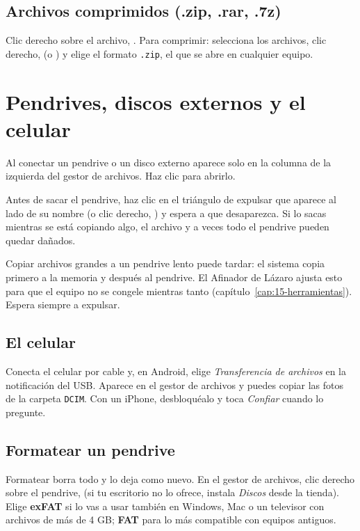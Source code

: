 \subsection{Archivos comprimidos (.zip, .rar, .7z)}
Clic derecho sobre el archivo, . Para comprimir:
selecciona los archivos, clic derecho,  (o
) y elige el formato \texttt{.zip}, el que se abre en
cualquier equipo.

\section{Pendrives, discos externos y el celular}

Al conectar un pendrive o un disco externo aparece solo en la columna de
la izquierda del gestor de archivos. Haz clic para abrirlo.

\begin{cuidado}
Antes de sacar el pendrive, haz clic en el triángulo de expulsar que
aparece al lado de su nombre (o clic derecho, ) y espera a
que desaparezca. Si lo sacas mientras se está copiando algo, el archivo
y a veces todo el pendrive pueden quedar dañados.
\end{cuidado}

\begin{nota}
Copiar archivos grandes a un pendrive lento puede tardar: el sistema
copia primero a la memoria y después al pendrive. El Afinador de Lázaro
ajusta esto para que el equipo no se congele mientras tanto
(capítulo~\ref{cap:15-herramientas}). Espera siempre a expulsar.
\end{nota}

\subsection{El celular}
Conecta el celular por cable y, en Android, elige \emph{Transferencia de
archivos} en la notificación del USB. Aparece en el gestor de archivos y
puedes copiar las fotos de la carpeta \texttt{DCIM}. Con un iPhone,
desbloquéalo y toca \emph{Confiar} cuando lo pregunte.

\subsection{Formatear un pendrive}
Formatear borra todo y lo deja como nuevo. En el gestor de archivos, clic
derecho sobre el pendrive,  (si tu escritorio no lo
ofrece, instala \emph{Discos} desde la tienda). Elige \textbf{exFAT} si
lo vas a usar también en Windows, Mac o un televisor con archivos de más
de 4 GB; \textbf{FAT} para lo más compatible con equipos antiguos.

